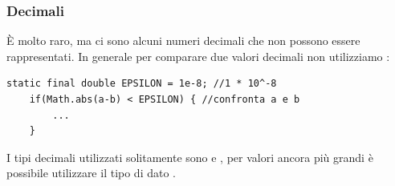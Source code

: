 \documentclass[../main.tex]{subfiles}
\begin{document}
\subsubsection{Decimali}
È molto raro, ma ci sono alcuni numeri decimali che non possono essere rappresentati. In generale per comparare due valori decimali
non utilizziamo \code{==}:
\begin{lstlisting}[style=java]
    static final double EPSILON = 1e-8; //1 * 10^-8
    if(Math.abs(a-b) < EPSILON) { //confronta a e b
        ...
    }
\end{lstlisting}
I tipi decimali utilizzati solitamente sono  e , per valori ancora più grandi è possibile utilizzare il tipo
di dato .
\end{document}
